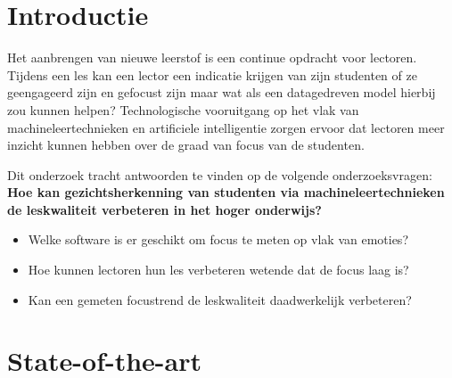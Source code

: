 
\section{Introductie} %
\label{sec:introductie}


Het aanbrengen van nieuwe leerstof is een continue opdracht voor lectoren. Tijdens een les kan een lector een indicatie krijgen van zijn studenten of ze geengageerd zijn en gefocust zijn maar wat als een datagedreven model hierbij zou kunnen helpen? Technologische vooruitgang op het vlak van machineleertechnieken en artificiele intelligentie zorgen ervoor dat lectoren meer inzicht kunnen hebben over de graad van focus van de studenten.

Dit onderzoek tracht antwoorden te vinden op de volgende onderzoeksvragen: 
\textbf{Hoe kan gezichtsherkenning van studenten via machineleertechnieken de leskwaliteit verbeteren in het hoger onderwijs?}
\begin{itemize}
    \item Welke software is er geschikt om focus te meten op vlak van emoties?
    \item Hoe kunnen lectoren hun les verbeteren wetende dat de focus laag is?
    \item Kan een gemeten focustrend de leskwaliteit daadwerkelijk verbeteren?
\end{itemize}


\section{State-of-the-art}
\label{sec:state-of-the-art}

